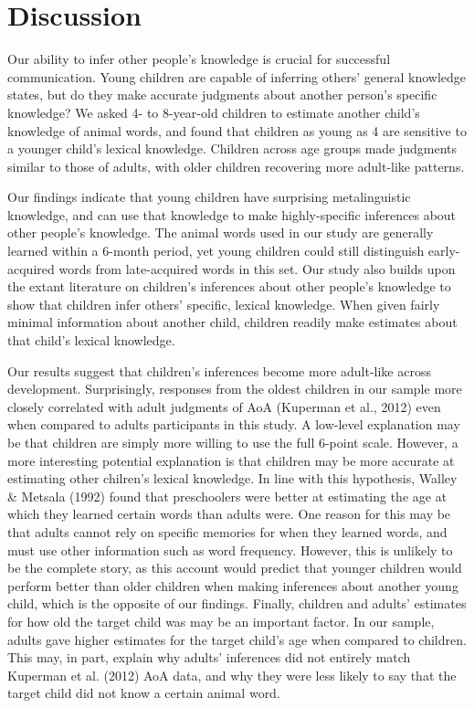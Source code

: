 \documentclass[10pt, letterpaper]{article}
\begin{document}
\hypertarget{discussion}{%
\section{Discussion}\label{discussion}}

Our ability to infer other people's knowledge is crucial for successful
communication. Young children are capable of inferring others' general
knowledge states, but do they make accurate judgments about another
person's specific knowledge? We asked 4- to 8-year-old children to
estimate another child's knowledge of animal words, and found that
children as young as 4 are sensitive to a younger child's lexical
knowledge. Children across age groups made judgments similar to those of
adults, with older children recovering more adult-like patterns.

Our findings indicate that young children have surprising metalinguistic
knowledge, and can use that knowledge to make highly-specific inferences
about other people's knowledge. The animal words used in our study are
generally learned within a 6-month period, yet young children could
still distinguish early-acquired words from late-acquired words in this
set. Our study also builds upon the extant literature on children's
inferences about other people's knowledge to show that children infer
others' specific, lexical knowledge. When given fairly minimal
information about another child, children readily make estimates about
that child's lexical knowledge.

Our results suggest that children's inferences become more adult-like
across development. Surprisingly, responses from the oldest children in
our sample more closely correlated with adult judgments of AoA (Kuperman
et al., 2012) even when compared to adults participants in this study. A
low-level explanation may be that children are simply more willing to
use the full 6-point scale. However, a more interesting potential
explanation is that children may be more accurate at estimating other
chilren's lexical knowledge. In line with this hypothesis, Walley \&
Metsala (1992) found that preschoolers were better at estimating the age
at which they learned certain words than adults were. One reason for
this may be that adults cannot rely on specific memories for when they
learned words, and must use other information such as word frequency.
However, this is unlikely to be the complete story, as this account
would predict that younger children would perform better than older
children when making inferences about another young child, which is the
opposite of our findings. Finally, children and adults' estimates for
how old the target child was may be an important factor. In our sample,
adults gave higher estimates for the target child's age when compared to
children. This may, in part, explain why adults' inferences did not
entirely match Kuperman et al. (2012) AoA data, and why they were less
likely to say that the target child did not know a certain animal word.
\end{document}
